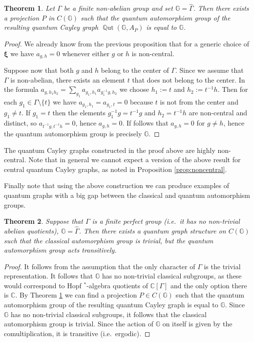 \documentclass[12pt]{amsart}
\newtheorem{thm}{Theorem}[section]
\theoremstyle{definition}
\theoremstyle{definition}
\theoremstyle{definition}
\theoremstyle{definition}
\DeclareMathOperator{\Qut}{\mathbb{Q}ut}
\newcommand{\G}{\mathbb{G}}
\newcommand{\C}{\mathbb{C}}
\numberwithin{equation}{section}
\begin{document}
\begin{thm}\label{Thm:cayleyaut}
Let $\Gamma$ be a finite non-abelian group and set $\G=\widehat{\Gamma}$. Then there exists a projection $P$ in $C(\G)$ such that the quantum automorphism group of the resulting quantum Cayley graph $\Qut(\G, A_P)$ is equal to $\G$.
\end{thm}
\begin{proof}
We already know from the previous proposition that for a generic choice of $\bm{\xi}$ we have $a_{g,h}=0$ whenever either $g$ or $h$ is non-central.   

Suppose now that both $g$ and $h$ belong to the center of $\Gamma$. Since we assume that $\Gamma$ is non-abelian, there exists an element $t$ that does not belong to the center. In the formula $a_{g, h_1 h_2} = \sum_{g_1} a_{g_1, h_1} a_{g_1^{-1}g, h_2}$ we choose $h_1:=t$ and $h_2 := t^{-1}h$. Then for each $g_1\in \Gamma\setminus\{t\}$ we have $a_{g_1,h_1} = a_{g_1,t}=0$ because $t$ is not from the center and $g_1\neq t$. If $g_1=t$ then the elements $g_{1}^{-1}g = t^{-1}g$ and $h_2 = t^{-1}h$ are non-central and distinct, so $a_{t^{-1}g, t^{-1}h}=0$, hence $a_{g,h}=0$. If follows that $a_{g,h}=0$ for $g\neq h$, hence the quantum automorphism group is precisely $\G$.
\end{proof}

The quantum Cayley graphs constructed in the proof above are highly non-central. Note that in general we cannot expect a version of the above result for central quantum Cayley graphs, as noted in Proposition \ref{prop:noncentral}.


Finally note that using the above construction we can produce examples of quantum graphs with a big gap between the classical and quantum automorphism groups.

\begin{thm}\label{thm:trivquat}
Suppose that $\Gamma$ is a finite perfect group (i.e.\ it has no non-trivial abelian quotients), $\G= \widehat{\Gamma}$. Then there exists a quantum graph structure on $C(\G)$ such that the classical automorphism group is trivial, but the quantum automorphism group acts transitively.
\end{thm}
\begin{proof}
It follows from the assumption that the only character of $\Gamma$ is the trivial representation. It follows that $\G$ has no non-trivial classical subgroups, as these would correspond to Hopf $^*$-algebra quotients of $\C[\Gamma]$ and the only option there is $\C$. By Theorem \ref{Thm:cayleyaut} we can find a projection $P \in C(\G)$ such that the quantum automorphism group of the resulting quantum Cayley graph is equal to $\G$. Since $\G$ has no non-trivial classical subgroups, it follows that the classical automorphism group is trivial. Since the action of $\G$ on itself is given by the comultiplication, it is transitive (i.e.\ ergodic).   
\end{proof}
\end{document}
